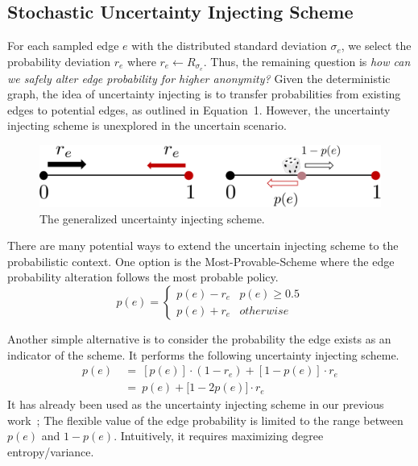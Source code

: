 \subsection{Stochastic Uncertainty Injecting Scheme}
For each sampled edge $e$ with the distributed standard deviation $\sigma_{e}$, we select the probability deviation $r_{e}$ where $r_{e} \leftarrow R_{\sigma_{e}}$. 
Thus, the remaining question is \emph{how can we safely alter edge probability for higher anonymity?}
Given the deterministic graph, the idea of uncertainty injecting is to transfer probabilities from existing edges to potential edges, as outlined in Equation~1.
However, the uncertainty injecting scheme is unexplored in the uncertain scenario.  
\begin{figure}[!htb]
  \centering
        \includegraphics[width=\linewidth]{ill/shift_UI.pdf}
    \caption{The generalized uncertainty injecting scheme.}
\end{figure}
There are many potential ways to extend the uncertain injecting scheme to the probabilistic context.   
One option is the Most-Provable-Scheme where the edge probability alteration follows the most probable policy.
\begin{equation*}
  p(e) =
  \begin{cases}
     p(e)-r_{e}    & p(e) \ge 0.5 \\
     p(e)+r_{e}    & otherwise 
  \end{cases}
  \label{eq:inject}
\end{equation*}

Another simple alternative is to consider the probability the edge exists as an indicator of the scheme. 
It performs the following uncertainty injecting scheme.
\begin{align}
  p(e)~&=~ [p(e)] \cdot (1-r_{e})+ [1-p(e)] \cdot r_{e} \\
      ~&=~ p(e) + \big[ 1- 2 p(e) \big] \cdot r_{e}
  \label{eq:ui}
\end{align}
It has already been used as the uncertainty injecting scheme in our previous work~\cite{Xiao:2018}; 
The flexible value of the edge probability is limited to the range between $p(e)$ and $1-p(e)$.
Intuitively, it requires maximizing degree entropy/variance. 

